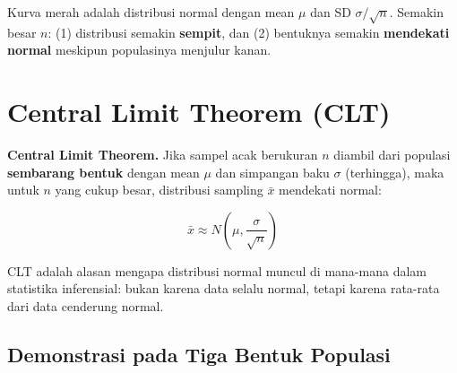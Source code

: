 \documentclass[
  indonesian,
  letterpaper,
]{book}
\begin{document}
Kurva merah adalah distribusi normal dengan mean \(\mu\) dan SD
\(\sigma/\sqrt{n}\). Semakin besar \(n\): (1) distribusi semakin
\textbf{sempit}, dan (2) bentuknya semakin \textbf{mendekati normal}
meskipun populasinya menjulur kanan.

\section{Central Limit Theorem (CLT)}\label{central-limit-theorem-clt}

\textbf{Central Limit Theorem.} Jika sampel acak berukuran \(n\) diambil
dari populasi \textbf{sembarang bentuk} dengan mean \(\mu\) dan
simpangan baku \(\sigma\) (terhingga), maka untuk \(n\) yang cukup
besar, distribusi sampling \(\bar{x}\) mendekati normal:

\[
\bar{x} \approx N\left(\mu, \frac{\sigma}{\sqrt{n}}\right)
\]

CLT adalah alasan mengapa distribusi normal muncul di mana-mana dalam
statistika inferensial: bukan karena data selalu normal, tetapi karena
rata-rata dari data cenderung normal.

\subsection{Demonstrasi pada Tiga Bentuk
Populasi}\label{demonstrasi-pada-tiga-bentuk-populasi}
\end{document}
